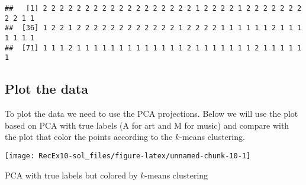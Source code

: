 \documentclass[]{article}
\newenvironment{Shaded}{\begin{snugshade}}{\end{snugshade}}
\newcommand{\CommentTok}[1]{\textcolor[rgb]{0.56,0.35,0.01}{\textit{#1}}}
\newcommand{\DataTypeTok}[1]{\textcolor[rgb]{0.13,0.29,0.53}{#1}}
\newcommand{\DecValTok}[1]{\textcolor[rgb]{0.00,0.00,0.81}{#1}}
\newcommand{\KeywordTok}[1]{\textcolor[rgb]{0.13,0.29,0.53}{\textbf{#1}}}
\newcommand{\NormalTok}[1]{#1}
\newcommand{\OperatorTok}[1]{\textcolor[rgb]{0.81,0.36,0.00}{\textbf{#1}}}
\newcommand{\StringTok}[1]{\textcolor[rgb]{0.31,0.60,0.02}{#1}}
\begin{document}
\begin{verbatim}
##   [1] 2 2 2 2 2 2 2 2 2 2 2 2 2 2 2 2 2 2 1 2 2 2 2 1 2 2 2 2 2 2 2 2 2 1 1
##  [36] 1 2 2 1 2 2 2 2 2 2 2 2 2 2 2 2 1 2 2 2 2 1 1 1 1 1 1 2 1 1 1 1 1 1 1
##  [71] 1 1 1 2 1 1 1 1 1 1 1 1 1 1 1 1 1 2 1 1 1 1 1 1 1 2 1 1 1 1 1 1
\end{verbatim}

\hypertarget{plot-the-data}{%
\subsection{Plot the data}\label{plot-the-data}}

To plot the data we need to use the PCA projections. Below we will use
the plot based on PCA with true labels (A for art and M for music) and
compare with the plot that color the points according to the \(k\)-means
clustering.

\begin{Shaded}
\end{Shaded}

\begin{center}\texttt{[image: RecEx10-sol\_files/figure-latex/unnamed-chunk-10-1]} \end{center}

PCA with true labels but colored by \(k\)-means clustering
\end{document}
